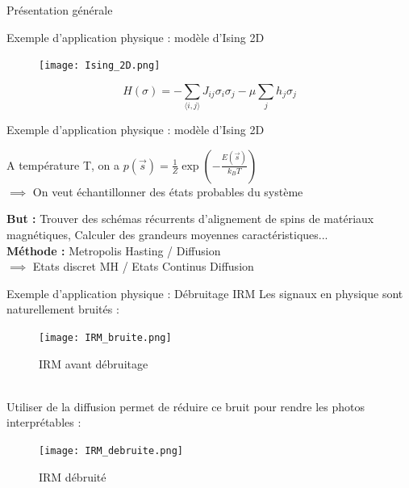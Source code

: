 \documentclass{beamer}
\begin{document}
\begin{frame}{Présentation générale}
	\end{frame}

 	\begin{frame}{Exemple d'application physique : modèle d'Ising 2D}
        \begin{figure}
            \centering
            \texttt{[image: Ising\_2D.png]}
            \label{fig:enter-label}
        \end{figure}
        \begin{equation*}
            H(\sigma) = -\sum_{\langle i, j \rangle} J_{ij} \sigma_i \sigma_j - \mu \sum_j h_j \sigma_j
        \end{equation*}
        \end{frame}

        
        \begin{frame}{Exemple d'application physique : modèle d'Ising 2D}
        
        A température T, on a $p(\Vec{s}) = \frac{1}{Z} \exp\left(-\frac{E(\Vec{s})}{k_B T}\right)$ \\
        $\implies$ On veut échantillonner des états probables du système \\
        \vspace{0.8cm}
        
        \textbf{But :} Trouver des schémas récurrents d'alignement de spins de matériaux magnétiques, Calculer des grandeurs moyennes caractéristiques... \\
        \vspace{0.8cm}
        \textbf{Méthode :} Metropolis Hasting / Diffusion \\
        $\implies$ Etats discret MH / Etats Continus Diffusion
	\end{frame}

        \begin{frame}{Exemple d'application physique : Débruitage IRM}
        \small Les signaux en physique sont naturellement bruités :
        \begin{figure}
            \centering
            \texttt{[image: IRM\_bruite.png]}
            \caption{IRM avant débruitage}
        \end{figure} \\
        
        \small Utiliser de la diffusion permet de réduire ce bruit pour rendre les photos interprétables :
        \begin{figure}
            \centering
            \texttt{[image: IRM\_debruite.png]}
            \caption{IRM débruité}
            \label{fig:enter-label}
        \end{figure}
        \end{frame}
	
\end{document}
